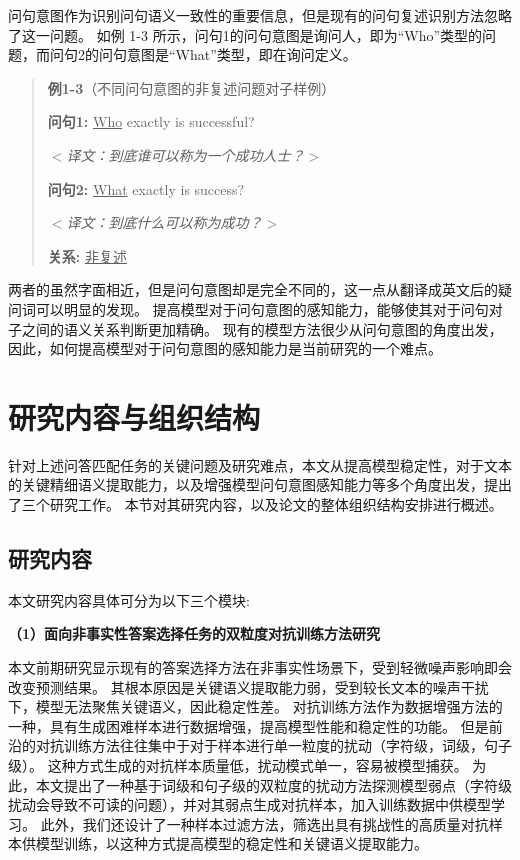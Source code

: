 问句意图作为识别问句语义一致性的重要信息，但是现有的问句复述识别方法忽略了这一问题。
如例 1-3 所示，问句1的问句意图是询问人，即为“Who”类型的问题，而问句2的问句意图是“What”类型，即在询问定义。
\begin{quotation}
    \noindent \textbf{\songti 例1-3}（不同问句意图的非复述问题对子样例）
    
    \noindent \textbf{问句1:} \underline{Who} exactly is successful?

    \noindent $<$\textit{译文：到底谁可以称为一个成功人士？}$>$
    
    \noindent \textbf{问句2:}  \underline{What} exactly is success?

    \noindent $<$\textit{译文：到底什么可以称为成功？}$>$
    
    \noindent \textbf{关系:} \underline{非复述}
    
\end{quotation}

两者的虽然字面相近，但是问句意图却是完全不同的，这一点从翻译成英文后的疑问词可以明显的发现。
提高模型对于问句意图的感知能力，能够使其对于问句对子之间的语义关系判断更加精确。
现有的模型方法很少从问句意图的角度出发，因此，如何提高模型对于问句意图的感知能力是当前研究的一个难点。


\section{研究内容与组织结构}

针对上述问答匹配任务的关键问题及研究难点，本文从提高模型稳定性，对于文本的关键精细语义提取能力，以及增强模型问句意图感知能力等多个角度出发，提出了三个研究工作。
本节对其研究内容，以及论文的整体组织结构安排进行概述。

\subsection{研究内容}

本文研究内容具体可分为以下三个模块:

\textbf{\songti （1）面向非事实性答案选择任务的双粒度对抗训练方法研究}

本文前期研究显示现有的答案选择方法在非事实性场景下，受到轻微噪声影响即会改变预测结果。
其根本原因是关键语义提取能力弱，受到较长文本的噪声干扰下，模型无法聚焦关键语义，因此稳定性差。
对抗训练方法作为数据增强方法的一种，具有生成困难样本进行数据增强，提高模型性能和稳定性的功能。
但是前沿的对抗训练方法往往集中于对于样本进行单一粒度的扰动（字符级，词级，句子级）。
这种方式生成的对抗样本质量低，扰动模式单一，容易被模型捕获。
为此，本文提出了一种基于词级和句子级的双粒度的扰动方法探测模型弱点（字符级扰动会导致不可读的问题），并对其弱点生成对抗样本，加入训练数据中供模型学习。
此外，我们还设计了一种样本过滤方法，筛选出具有挑战性的高质量对抗样本供模型训练，以这种方式提高模型的稳定性和关键语义提取能力。

